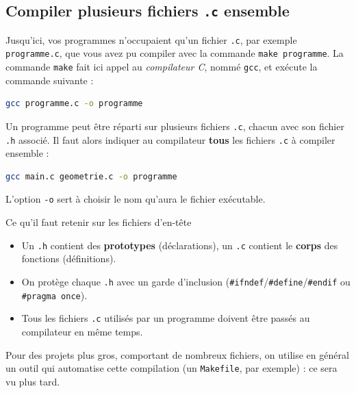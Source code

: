 \subsection{Compiler plusieurs fichiers \texttt{.c} ensemble}

Jusqu'ici, vos programmes n'occupaient qu'un fichier \texttt{.c}, par exemple \texttt{programme.c}, que vous avez pu compiler avec la commande \texttt{make programme}. La commande \texttt{make} fait ici appel au \emph{compilateur C}, nommé \texttt{gcc}, et exécute la commande suivante :

\begin{lstlisting}[language=bash,caption={Compilation d'un seul fichier source directement avec gcc}]
gcc programme.c -o programme
\end{lstlisting}

Un programme peut être réparti sur plusieurs fichiers \texttt{.c}, chacun avec son fichier \texttt{.h} associé. Il faut alors indiquer au compilateur \textbf{tous} les fichiers \texttt{.c} à compiler ensemble :

\begin{lstlisting}[language=bash,caption={Compilation de plusieurs fichiers sources}]
gcc main.c geometrie.c -o programme
\end{lstlisting}

L'option \texttt{-o} sert à choisir le nom qu'aura le fichier exécutable.

\begin{UPSTIinfor}{Ce qu'il faut retenir sur les fichiers d'en-tête}
  \begin{itemize}
    \item Un \texttt{.h} contient des \textbf{prototypes} (déclarations), un \texttt{.c} contient le \textbf{corps} des fonctions (définitions).
    \item On protège chaque \texttt{.h} avec un garde d'inclusion (\texttt{\#ifndef}/\texttt{\#define}/\texttt{\#endif} ou \texttt{\#pragma once}).
    \item Tous les fichiers \texttt{.c} utilisés par un programme doivent être passés au compilateur en même temps.
  \end{itemize}
\end{UPSTIinfor}

Pour des projets plus gros, comportant de nombreux fichiers, on utilise en général un outil qui automatise cette compilation (un \texttt{Makefile}, par exemple) : ce sera vu plus tard.
